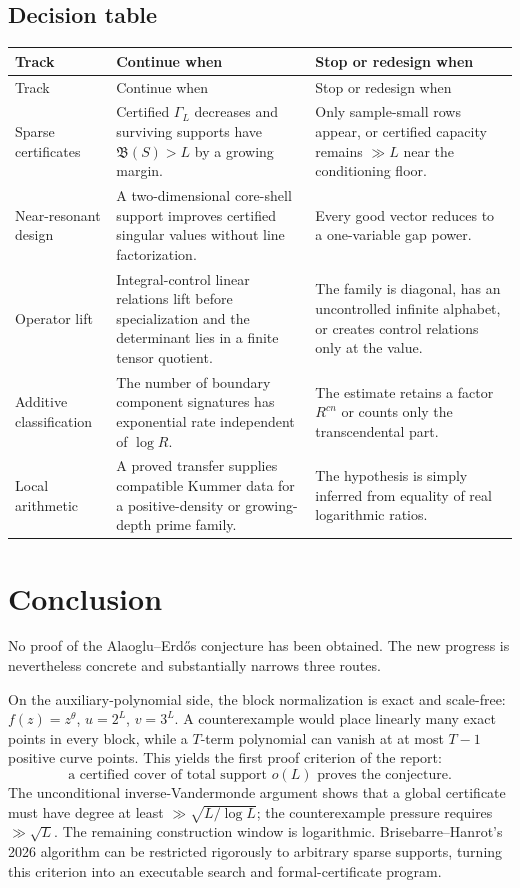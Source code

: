 \documentclass[11pt,oneside]{article}
\theoremstyle{definition}
\theoremstyle{remark}
\newcommand{\AEconj}{Alaoglu--Erd\H{o}s}
\newcommand{\tht}{\theta}
\begin{document}
\subsection{Decision table}

\begin{longtable}{L{0.18\textwidth}L{0.34\textwidth}L{0.39\textwidth}}
\toprule
Track & Continue when & Stop or redesign when \\
\midrule
\endfirsthead
\toprule
Track & Continue when & Stop or redesign when \\
\midrule
\endhead
Sparse certificates & Certified $\Gamma_L$ decreases and surviving supports have $\mathfrak B(S)>L$ by a growing margin. & Only sample-small rows appear, or certified capacity remains $\gg L$ near the conditioning floor. \\
Near-resonant design & A two-dimensional core-shell support improves certified singular values without line factorization. & Every good vector reduces to a one-variable gap power. \\
Operator lift & Integral-control linear relations lift before specialization and the determinant lies in a finite tensor quotient. & The family is diagonal, has an uncontrolled infinite alphabet, or creates control relations only at the value. \\
Additive classification & The number of boundary component signatures has exponential rate independent of $\log R$. & The estimate retains a factor $R^{cn}$ or counts only the transcendental part. \\
Local arithmetic & A proved transfer supplies compatible Kummer data for a positive-density or growing-depth prime family. & The hypothesis is simply inferred from equality of real logarithmic ratios. \\
\bottomrule
\end{longtable}

\section{Conclusion}
\label{sec:conclusion}

No proof of the \AEconj{} conjecture has been obtained.  The new progress is nevertheless concrete and
substantially narrows three routes.

On the auxiliary-polynomial side, the block normalization is exact and scale-free:
$f(z)=z^{\tht}$, $u=2^L$, $v=3^L$.  A counterexample would place linearly many exact points in
every block, while a $T$-term polynomial can vanish at at most $T-1$ positive curve points.  This
yields the first proof criterion of the report:
\[
  \text{a certified cover of total support }o(L)\text{ proves the conjecture.}
\]
The unconditional inverse-Vandermonde argument shows that a global certificate must have degree
at least $\gg\sqrt{L/\log L}$; the counterexample pressure requires $\gg\sqrt L$.  The remaining
construction window is logarithmic.  Brisebarre--Hanrot's 2026 algorithm can be restricted
rigorously to arbitrary sparse supports, turning this criterion into an executable search and
formal-certificate program.
\end{document}
